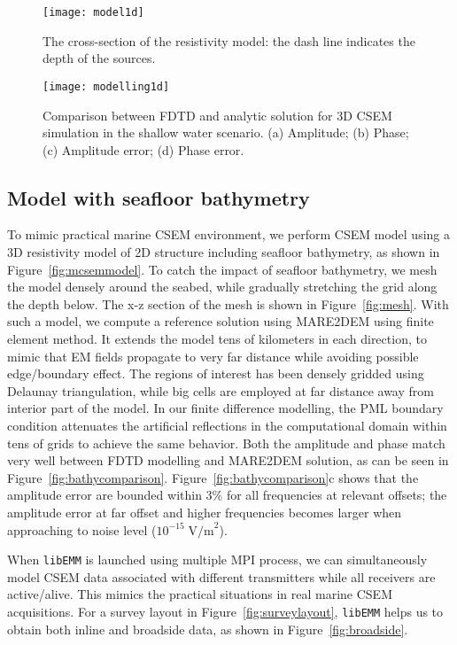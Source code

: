 \documentclass[a4paper,10pt]{article}
\begin{document}
\begin{figure}[!htb]
  \centering
  \texttt{[image: model1d]}
  \caption{The cross-section of the resistivity model: the dash line indicates the depth of the sources.}\label{fig:model1d}
\end{figure}

\begin{figure}[!htb]
  \centering
  \texttt{[image: modelling1d]}
  \caption{Comparison  between FDTD and analytic solution for 3D CSEM simulation in the shallow water scenario. (a) Amplitude; (b) Phase; (c) Amplitude error; (d) Phase error.}\label{fig:comparison}
\end{figure}


\subsection{Model with seafloor bathymetry}

To mimic practical marine CSEM environment, we perform CSEM model using a 3D resistivity model of 2D structure including seafloor bathymetry, as shown in Figure~\ref{fig:mcsemmodel}. To catch the impact of seafloor bathymetry, we mesh the model densely around the seabed, while gradually stretching the grid along the depth below. The x-z section of the mesh is shown in Figure~\ref{fig:mesh}. With such a model, we compute a reference solution using MARE2DEM \citep{key2016mare2dem} using finite element method. 
 It extends the model tens of kilometers in each direction, to mimic that EM fields propagate to very far distance while avoiding possible edge/boundary effect. The regions of interest has been densely gridded using Delaunay triangulation, while big cells are employed at far distance away from interior part of the model. In our finite difference modelling, the PML boundary condition attenuates the artificial reflections in the computational domain within tens of grids to achieve the same behavior. Both the amplitude and phase match very well between FDTD modelling and MARE2DEM solution, as can be seen in Figure~\ref{fig:bathycomparison}. Figure~\ref{fig:bathycomparison}c shows that the amplitude error are bounded within 3\% for all frequencies at relevant offsets; the amplitude error at far offset and higher frequencies becomes larger when approaching to noise level ($10^{-15} \;\mbox{V/m}^2 $).
 
When \verb|libEMM| is launched using multiple MPI process, we can simultaneously model CSEM data associated with different transmitters while all receivers are active/alive. This mimics the practical situations in real marine CSEM acquisitions. For a survey layout in Figure~\ref{fig:surveylayout}, \verb|libEMM| helps us to obtain both inline and broadside data, as shown in Figure~\ref{fig:broadside}.
\end{document}
